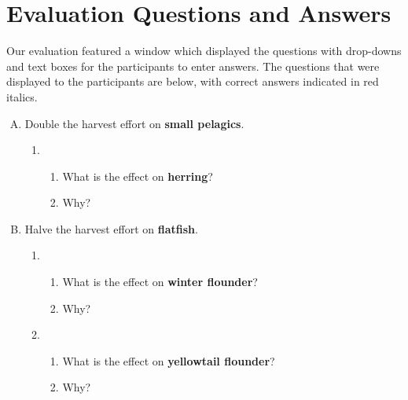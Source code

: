 \chapter{Evaluation Questions and Answers}

Our evaluation featured a window which displayed the questions with drop-downs and text boxes for the participants to enter answers.  The questions that were displayed to the participants are below, with correct answers indicated in red italics.

\begin{enumerate}[(A)]
\item Double the harvest effort on \textbf{small pelagics}.

\begin{enumerate}[1.]
\item 
\begin{enumerate}
\item What is the effect on \textbf{herring}? 
\item Why? 
\end{enumerate}
\end{enumerate}

\item Halve the harvest effort on \textbf{flatfish}.

\begin{enumerate}[1.] \addtocounter{enumii}{1}
\item 
\begin{enumerate}
\item What is the effect on \textbf{winter flounder}? 
\item Why? 
\end{enumerate}

\item 
\begin{enumerate}
\item What is the effect on \textbf{yellowtail flounder}? 
\item Why? 
\end{enumerate}
\end{enumerate}


\end{enumerate}
